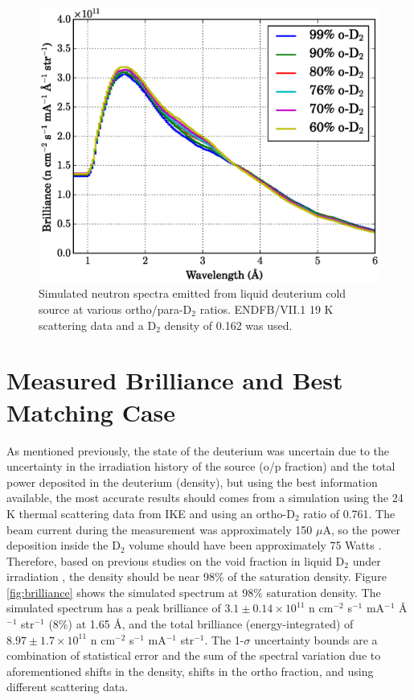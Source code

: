 \documentclass[5p,12pt]{elsarticle}
\begin{document}
\begin{figure}[h!] 
  \centering
    \includegraphics[width=\columnwidth]{graphics/op_compare.eps}
     \caption{Simulated neutron spectra emitted from liquid deuterium cold source at various ortho/para-D$_2$ ratios. ENDFB/VII.1 19 K scattering data and a D$_2$ density of 0.162 was used.   \label{fig:op_compare}}
\end{figure}

%
%
%
%
%

\section{Measured Brilliance and Best Matching Case}
\label{sec:results}

As mentioned previously, the state of the deuterium was uncertain due to the uncertainty in the irradiation history of the source (o/p fraction) and the total power deposited in the deuterium (density), but using the best information available, the most accurate results should comes from a simulation using the 24 K thermal scattering data from IKE and using an ortho-D$_2$ ratio of 0.761.  The beam current during the measurement was approximately 150 $\mu$A, so the power deposition inside the D$_2$ volume should have been approximately 75 Watts \cite{sinq_power}.  Therefore, based on previous studies on the void fraction in liquid D$_2$ under irradiation \cite{Siegwarth_Olson_Lewis_Rowe_Williams_1994}, the density should be near 98\% of the saturation density.  Figure \ref{fig:brilliance} shows the simulated spectrum at 98\% saturation density.  The simulated spectrum has a peak brilliance of $3.1 \pm 0.14\times10^{11}$ n cm$^{-2}$ s$^{-1}$ mA$^{-1}$ \AA$^{-1}$ str$^{-1}$ (8\%) at 1.65 {\AA}, and the total brilliance (energy-integrated) of $8.97 \pm 1.7\times10^{11}$ n cm$^{-2}$ s$^{-1}$ mA$^{-1}$ str$^{-1}$.  The 1-$\sigma$ uncertainty bounds are a combination of statistical error and the sum of the spectral variation due to aforementioned shifts in the density, shifts in the ortho fraction, and using different scattering data.
\end{document}
